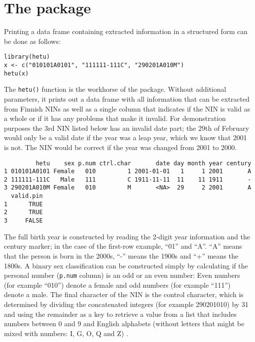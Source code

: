 \section{\texorpdfstring{The  package}{The  package}}\label{the-package}

Printing a data frame containing extracted information in a structured form can be done as follows:

\begin{verbatim}
library(hetu)
x <- c("010101A0101", "111111-111C", "290201A010M")
hetu(x)
\end{verbatim}

The \texttt{hetu()} function is the workhorse of the  package. Without additional parameters, it prints out a data frame with all information that can be extracted from Finnish NINs as well as a single column that indicates if the NIN is valid as a whole or if it has any problems that make it invalid. For demonstration purposes the 3rd NIN listed below has an invalid date part; the 29th of February would only be a valid date if the year was a leap year, which we know that 2001 is not. The NIN would be correct if the year was changed from 2001 to 2000.

\begin{verbatim}
         hetu    sex p.num ctrl.char       date day month year century
1 010101A0101 Female   010         1 2001-01-01   1     1 2001       A
2 111111-111C   Male   111         C 1911-11-11  11    11 1911       -
3 290201A010M Female   010         M       <NA>  29     2 2001       A
  valid.pin
1      TRUE
2      TRUE
3     FALSE
\end{verbatim}

The full birth year is constructed by reading the 2-digit year information and the century marker; in the case of the first-row example, ``01'' and ``A''. ``A'' means that the person is born in the 2000s, ``-'' means the 1900s and ``+'' means the 1800s. A binary sex classification can be constructed simply by calculating if the personal number (\texttt{p.num} column) is an odd or an even number: Even numbers (for example ``010'') denote a female and odd numbers (for example ``111'') denote a male. The final character of the NIN is the control character, which is determined by dividing the concatenated integers (for example 290201010) by 31 and using the remainder as a key to retrieve a value from a list that includes numbers between 0 and 9 and English alphabets (without letters that might be mixed with numbers: I, G, O, Q and Z) \citep{hetudvv, salste2021}.

